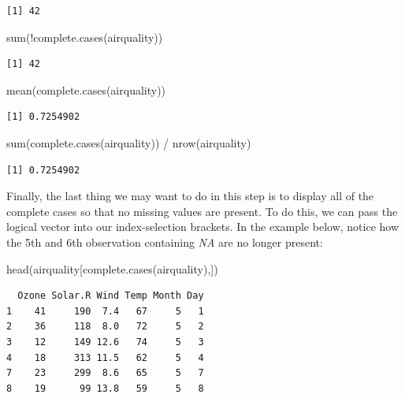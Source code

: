 \documentclass[
  letterpaper,
  DIV=11,
  numbers=noendperiod]{scrreprt}
\newenvironment{Shaded}{\begin{snugshade}}{\end{snugshade}}
\newcommand{\FunctionTok}[1]{\textcolor[rgb]{0.28,0.35,0.67}{#1}}
\newcommand{\NormalTok}[1]{\textcolor[rgb]{0.00,0.23,0.31}{#1}}
\newcommand{\SpecialCharTok}[1]{\textcolor[rgb]{0.37,0.37,0.37}{#1}}
\begin{document}
\begin{verbatim}
[1] 42
\end{verbatim}

\begin{Shaded}
\begin{Highlighting}[]
\FunctionTok{sum}\NormalTok{(}\SpecialCharTok{!}\FunctionTok{complete.cases}\NormalTok{(airquality))}
\end{Highlighting}
\end{Shaded}

\begin{verbatim}
[1] 42
\end{verbatim}

\begin{Shaded}
\begin{Highlighting}[]
\FunctionTok{mean}\NormalTok{(}\FunctionTok{complete.cases}\NormalTok{(airquality))}
\end{Highlighting}
\end{Shaded}

\begin{verbatim}
[1] 0.7254902
\end{verbatim}

\begin{Shaded}
\begin{Highlighting}[]
\FunctionTok{sum}\NormalTok{(}\FunctionTok{complete.cases}\NormalTok{(airquality)) }\SpecialCharTok{/} \FunctionTok{nrow}\NormalTok{(airquality)}
\end{Highlighting}
\end{Shaded}

\begin{verbatim}
[1] 0.7254902
\end{verbatim}

Finally, the last thing we may want to do in this step is to display all
of the complete cases so that no missing values are present. To do this,
we can pass the logical vector into our index-selection brackets. In the
example below, notice how the 5th and 6th observation containing
\emph{NA} are no longer present:

\begin{Shaded}
\begin{Highlighting}[]
\FunctionTok{head}\NormalTok{(airquality[}\FunctionTok{complete.cases}\NormalTok{(airquality),])}
\end{Highlighting}
\end{Shaded}

\begin{verbatim}
  Ozone Solar.R Wind Temp Month Day
1    41     190  7.4   67     5   1
2    36     118  8.0   72     5   2
3    12     149 12.6   74     5   3
4    18     313 11.5   62     5   4
7    23     299  8.6   65     5   7
8    19      99 13.8   59     5   8
\end{verbatim}
\end{document}
